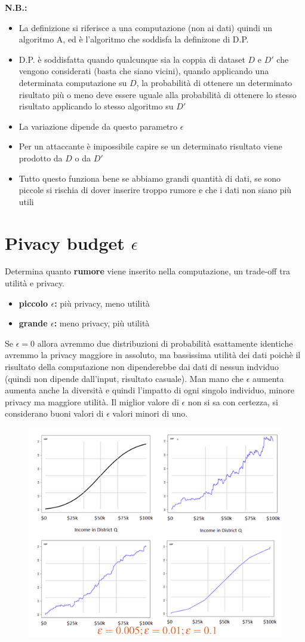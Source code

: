 \documentclass{report}
\begin{document}
\textbf{N.B.:} 
\begin{itemize}
    \item La definizione si riferisce a una computazione (non ai dati) quindi un algoritmo A, ed è l'algoritmo che soddisfa la definizone di D.P.
    \item D.P. è soddisfatta quando qualcunque sia la coppia di dataset $D$ e $D'$ che vengono considerati (basta che siano vicini), quando applicando
    una determinata computazione su $D$, la probabilità di ottenere un determinato risultato più o meno deve essere uguale alla probabilità di ottenere lo stesso
    risultato applicando lo stesso algoritmo su $D'$
    \item La variazione dipende da questo parametro $\epsilon$
    \item Per un attaccante è impossibile capire se un determinato risultato viene prodotto da $D$ o da $D'$
    \item Tutto questo funziona bene se abbiamo grandi quantità di dati, se sono piccole si rischia di dover inserire troppo rumore e che i dati non siano più utili
\end{itemize}

\section{Pivacy budget $\epsilon$}
Determina quanto  \textbf{rumore} viene inserito nella computazione, un trade-off tra utilità e privacy.
\begin{itemize}
    \item \textbf{piccolo $\epsilon$:} più privacy, meno utilità
    \item \textbf{grande $\epsilon$:} meno privacy, più utilità
\end{itemize}

\noindent Se $\epsilon = 0$ allora avremmo due distribuzioni di probabilità esattamente identiche
avremmo la privacy maggiore in assoluto, ma bassissima utilità dei dati poichè il risultato della computazione non dipenderebbe dai dati di nessun indviduo (quindi non dipende dall'input, risultato casuale).
Man mano che $\epsilon$ aumenta aumenta anche la diversità e quindi l'impatto di ogni singolo individuo, minore privacy ma maggiore utilità.
Il miglior valore di $\epsilon$ non si sa con certezza, si considerano buoni valori di $\epsilon$ valori minori di uno. 
\begin{figure}[H]
        \centering
        \includegraphics[width=0.4\linewidth]{images/curve.png}
    \end{figure}
\end{document}
